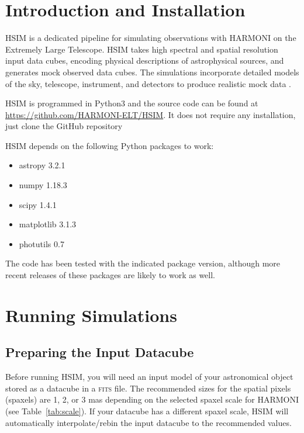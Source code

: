 \documentclass[12pt]{report}
\begin{document}
\section{Introduction and Installation}

HSIM is a dedicated pipeline for simulating observations with HARMONI on the Extremely Large Telescope. HSIM takes high spectral and spatial resolution input data cubes, encoding physical descriptions of astrophysical sources, and generates mock observed data cubes. The simulations incorporate detailed models of the sky, telescope, instrument, and detectors to produce realistic mock data \citep{Zieleniewski2015}.

HSIM is programmed in Python3 and the source code can be found at \url{https://github.com/HARMONI-ELT/HSIM}. It does not require any installation, just clone the GitHub repository 


HSIM depends on the following Python packages to work:

\begin{itemize}
\setlength\itemsep{-0.5ex}
\item astropy 3.2.1
\item numpy 1.18.3
\item scipy 1.4.1
\item matplotlib 3.1.3
\item photutils 0.7
\end{itemize}

The code has been tested with the indicated package version, although more recent releases of these packages are likely to work as well.


\section{Running Simulations}

\subsection{Preparing the Input Datacube}

Before running HSIM, you will need an input model of your astronomical object stored as a datacube in a \textsc{fits} file. The recommended sizes for the spatial pixels (spaxels) are 1, 2, or 3 mas depending on the selected spaxel scale for HARMONI (see Table~\ref{tab:scale}). If your datacube has a different spaxel scale, HSIM will automatically interpolate\slash rebin the input datacube to the recommended values.
\end{document}
